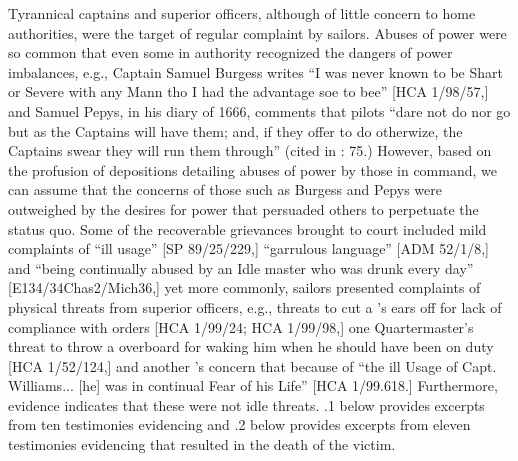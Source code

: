 Tyrannical captains and superior officers, although of little concern to home authorities, were the target of regular complaint by sailors. Abuses of power were so common that even some in authority recognized the dangers of power imbalances, e.g., Captain Samuel Burgess writes “I was never known to be Shart or Severe with any Mann tho I had the advantage soe to bee” [HCA 1/98/57,] and Samuel Pepys, in his diary of 1666, comments that pilots “dare not do nor go but as the Captains will have them; and, if they offer to do otherwize, the Captains swear they will run them through” (cited in \citealt{Lavery2009}: 75.) However, based on the profusion of depositions detailing abuses of power by those in command, we can assume that the concerns of those such as Burgess and Pepys were outweighed by the desires for power that persuaded others to perpetuate the status quo. Some of the recoverable grievances brought to court included mild complaints of “ill usage” [SP 89/25/229,] “garrulous language” [ADM 52/1/8,] and “being continually abused by an Idle master who was drunk every day” [E134/34Chas2/Mich36,] yet more commonly, sailors presented complaints of physical threats from superior officers, e.g., threats to cut a ’s ears off for lack of compliance with orders [HCA 1/99/24; HCA 1/99/98,] one Quartermaster’s threat to throw a  overboard for waking him when he should have been on duty [HCA 1/52/124,] and another ’s concern that because of “the ill Usage of Capt. Williams... [he] was in continual Fear of his Life” [HCA 1/99.618.] Furthermore, evidence indicates that these were not idle threats. .1 below provides excerpts from ten testimonies evidencing  and .2 below provides excerpts from eleven testimonies evidencing  that resulted in the death of the victim.

